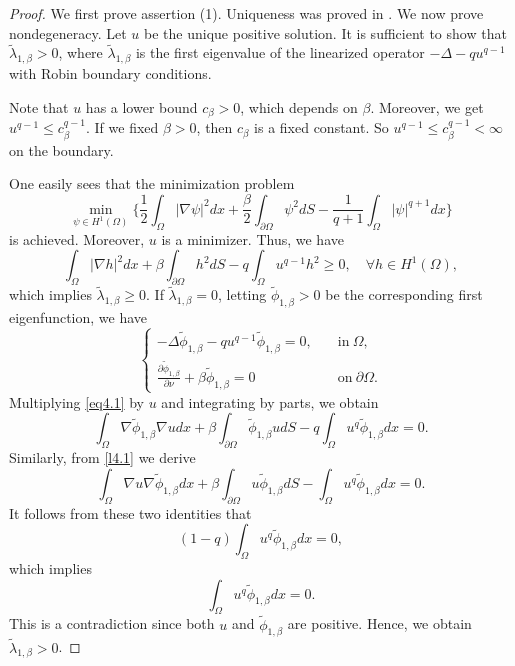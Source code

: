 \documentclass[12pt,reqno]{amsart}
\numberwithin{equation}{section}
\theoremstyle{definition}
\begin{document}
\begin{proof}
We first prove assertion (1). 
Uniqueness was proved in \cite{CGL}. We now prove nondegeneracy. Let $u$ be the unique positive solution. It is sufficient to show that $\tilde{\lambda}_{1,\beta}>0$, where  $\tilde{\lambda}_{1,\beta}$ is the first eigenvalue of the linearized operator $-\Delta -qu^{q-1}$ with Robin boundary conditions.

Note that $u$ has a lower bound $c_\beta>0$, which depends on $\beta$. Moreover, we get $u^{q-1}\le c_\beta^{q-1}$. If we fixed $\beta>0$, then $c_\beta$ is a fixed constant. So $u^{q-1}\le c_\beta^{q-1}<\infty$ on the boundary.

One easily sees that the minimization problem 
$$
\min_{\psi\in H^1(\Omega)}\Big\{\frac{1}{2}\int_{\Omega}|\nabla \psi|^2dx+\frac{\beta}{2}\int_{\partial\Omega}\psi^2dS-\frac{1}{q+1}\int_{\Omega}|\psi|^{q+1}dx \Big\}
$$
is achieved. Moreover, $u$ is a minimizer. Thus, we have 
$$
\int_{\Omega}|\nabla h|^2dx+\beta\int_{\partial\Omega}h^2dS-q\int_{\Omega}u^{q-1}h^2\geq 0,\quad \forall h\in H^1(\Omega),
$$
which implies $\tilde{\lambda}_{1,\beta}\ge 0$. If $\tilde{\lambda}_{1,\beta}=0$, letting $\tilde{\phi}_{1,\beta}>0$ be the corresponding first eigenfunction, we have 
\begin{equation}\label{eq4.1}
\begin{cases}
-\Delta \tilde{\phi}_{1,\beta}-qu^{q-1}\tilde{\phi}_{1,\beta}=0,\quad &\text{in}\ \Omega,\\
\frac{\partial \tilde{\phi}_{1,\beta}}{\partial \nu}+\beta \tilde{\phi}_{1,\beta}=0 &\text{on}\ \partial\Omega.
\end{cases}
\end{equation}
Multiplying \eqref{eq4.1} by $u$ and integrating by parts, we obtain
\begin{equation}\label{eq4.2}
\int_{\Omega}\nabla \tilde{\phi}_{1,\beta}\nabla udx+\beta\int_{\partial\Omega}\tilde{\phi}_{1,\beta}udS-q\int_{\Omega}u^q\tilde{\phi}_{1,\beta}dx=0.
\end{equation}
Similarly, from \eqref{l4.1} we derive 
\begin{equation}\label{eq4.3}
\int_{\Omega}\nabla u \nabla \tilde{\phi}_{1,\beta}dx+\beta\int_{\partial\Omega}u\tilde{\phi}_{1,\beta}dS-\int_{\Omega}u^q\tilde{\phi}_{1,\beta}dx=0.
\end{equation}
It follows from these two identities that 
$$
(1-q)\int_{\Omega}u^q\tilde{\phi}_{1,\beta}dx=0,
$$
which implies 
$$
\int_{\Omega}u^q\tilde{\phi}_{1,\beta}dx=0.
$$
This is a contradiction since both $u$ and $\tilde{\phi}_{1,\beta}$ are positive. Hence, we obtain $\tilde{\lambda}_{1,\beta}>0$. 


\end{proof}
\end{document}
